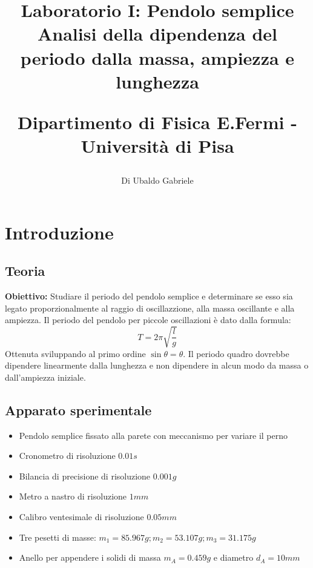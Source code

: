\documentclass[a4paper,10pt]{article}
\title{Laboratorio I: Pendolo semplice\\ Analisi della dipendenza del periodo dalla massa, ampiezza e lunghezza\\
\begin{large}
Dipartimento di Fisica E.Fermi - Università di Pisa
\end{large}}
\author{Di Ubaldo Gabriele}
\date{}
\begin{document}
\maketitle


\section{Introduzione}
\subsection{Teoria}
\textbf{Obiettivo:} Studiare il periodo del pendolo semplice e determinare se esso sia legato proporzionalmente al raggio di oscillazzione, alla massa oscillante e 
alla ampiezza. 
Il periodo del pendolo per piccole oscillazioni è dato dalla formula:
\begin{equation}\label{pendolo}
T=2\pi\sqrt{\frac{l}{g}}
\end{equation}
Ottenuta sviluppando al primo ordine $\sin\theta=\theta$. Il periodo quadro dovrebbe dipendere linearmente dalla lunghezza e non dipendere in alcun modo da massa o dall'ampiezza iniziale.

\subsection{Apparato sperimentale}
\begin{itemize}
\item{Pendolo semplice fissato alla parete con meccanismo per variare il perno}
\item{Cronometro di risoluzione $0.01s$}
\item{Bilancia di precisione di risoluzione $0.001g$}
\item{Metro a nastro di risoluzione $1mm$}
\item{Calibro ventesimale di risoluzione $0.05 mm$}
\item{Tre pesetti di masse: $m_1=85.967g; m_2=53.107g; m_3=31.175g$}
\item{Anello per appendere i solidi di massa $m_A=0.459g$ e diametro $d_A=10mm$}
\end{itemize}

\end{document}
